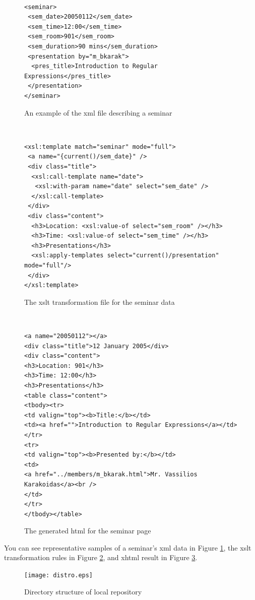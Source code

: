 \documentclass{article}
\begin{document}
\begin{figure}
{\small \tt%
\begin{verbatim}
<seminar>
 <sem_date>20050112</sem_date>
 <sem_time>12:00</sem_time>
 <sem_room>901</sem_room>
 <sem_duration>90 mins</sem_duration>
 <presentation by="m_bkarak">
  <pres_title>Introduction to Regular Expressions</pres_title>
 </presentation>
</seminar>
\end{verbatim}
}
\caption{An example of the {\sc xml} file describing a seminar}
\label{fig:project-xml}
\end{figure}

\begin{figure}
{\small \tt%
\begin{verbatim}
<xsl:template match="seminar" mode="full">
 <a name="{current()/sem_date}" />
 <div class="title">
  <xsl:call-template name="date">
   <xsl:with-param name="date" select="sem_date" />
  </xsl:call-template>
 </div>
 <div class="content">
  <h3>Location: <xsl:value-of select="sem_room" /></h3>
  <h3>Time: <xsl:value-of select="sem_time" /></h3>
  <h3>Presentations</h3>
  <xsl:apply-templates select="current()/presentation" mode="full"/>
 </div>
</xsl:template>
\end{verbatim}
}
\caption{The {\sc xslt} transformation file for the seminar data}
\label{fig:project-xslt}
\end{figure}

\begin{figure}
{\small \tt%
\begin{verbatim}
<a name="20050112"></a>
<div class="title">12 January 2005</div>
<div class="content">
<h3>Location: 901</h3>
<h3>Time: 12:00</h3>
<h3>Presentations</h3>
<table class="content">
<tbody><tr>
<td valign="top"><b>Title:</b></td>
<td><a href="">Introduction to Regular Expressions</a></td>
</tr>
<tr>
<td valign="top"><b>Presented by:</b></td>
<td>
<a href="../members/m_bkarak.html">Mr. Vassilios Karakoidas</a><br />
</td>
</tr>
</tbody></table>
\end{verbatim}
}
\caption{The generated {\sc html} for the seminar page}
\label{fig:project-html}
\end{figure}

You can see representative samples of a seminar's
{\sc xml} data in Figure \ref{fig:project-xml}, the
{\sc xslt} transformation rules in Figure \ref{fig:project-xslt},
and {\sc xhtml} result in Figure \ref{fig:project-html}.

\begin{figure}
\texttt{[image: distro.eps]}
\caption{Directory structure of local repository}
\label{fig:eltrun-web-distro}
\end{figure}
\end{document}
